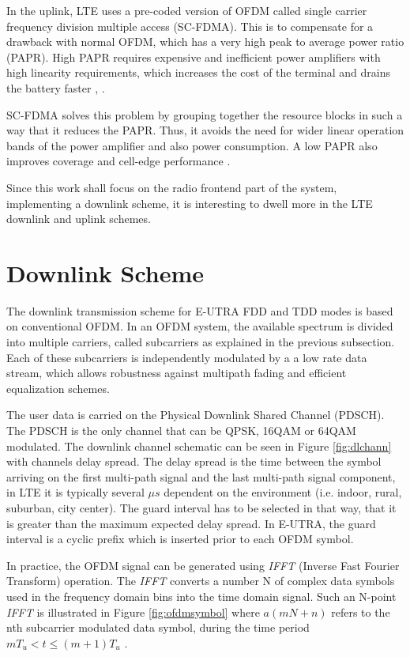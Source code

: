 In the uplink, LTE uses a pre-coded version of OFDM called single carrier
frequency division multiple access (SC-FDMA). This is to compensate for a
drawback with normal OFDM, which has a very high peak to average power ratio
(PAPR). High PAPR requires expensive and inefficient power amplifiers with high
linearity requirements, which increases the cost of the terminal and drains the
battery faster \cite{introlte}, \cite{umtslte}.

SC-FDMA solves this problem by grouping together the resource blocks in such a
way that it reduces the PAPR. Thus, it avoids the need for wider linear
operation bands of the power amplifier and also power consumption. A low PAPR
also improves coverage and cell-edge performance \cite{introlte}.

Since this work shall focus on the radio frontend part of the system, implementing
a downlink scheme, it is interesting to dwell more in the LTE downlink and uplink
schemes.

\section{Downlink Scheme}%

The downlink transmission scheme for E-UTRA FDD and TDD modes is based on
conventional OFDM. In an OFDM system, the available spectrum is divided into
multiple carriers, called subcarriers as explained in the previous subsection.
Each of these subcarriers is independently modulated by a a low rate data
stream, which allows robustness against multipath fading and efficient
equalization schemes.

The user data is carried on the Physical Downlink Shared Channel (PDSCH). The
PDSCH is the only channel that can be QPSK, 16QAM or 64QAM modulated. The
downlink channel schematic can be seen in Figure \ref{fig:dlchann} with channels
delay spread. The delay spread is the time between the symbol arriving on the
first multi-path signal and the last multi-path signal component, in LTE it is
typically several $\mu s$ dependent on the environment (i.e. indoor, rural,
suburban, city center). The guard interval has to be selected in that way, that
it is greater than the maximum expected delay spread. In E-UTRA, the guard
interval is a cyclic prefix which is inserted prior to each OFDM symbol.

In practice, the OFDM signal can be generated using \textit{IFFT} (Inverse Fast
Fourier Transform) operation. The \textit{IFFT} converts a number N of complex
data symbols used in the frequency domain bins into the time domain signal. Such
an N-point \textit{IFFT} is illustrated in Figure \ref{fig:ofdmsymbol} where
$a(mN+n)$ refers to the nth subcarrier modulated data symbol, during the time
period $mT_u < t \le (m+1)T_u$ \cite{umtslte}.

